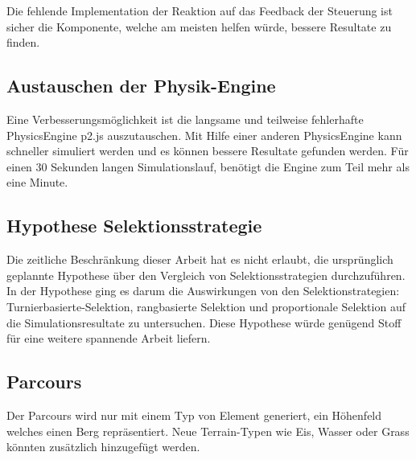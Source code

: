       Die fehlende Implementation der Reaktion auf das Feedback der Steuerung ist sicher die Komponente,
      welche am meisten helfen würde, bessere Resultate zu finden.

    \subsection{Austauschen der Physik-Engine}

      Eine Verbesserungsmöglichkeit ist die langsame und teilweise fehlerhafte \gls{PhysicsEngine} p2.js auszutauschen.
      Mit Hilfe einer anderen \gls{PhysicsEngine} kann schneller simuliert werden und es können bessere Resultate gefunden werden.
      Für einen 30 Sekunden langen Simulationslauf, benötigt die Engine zum Teil mehr als eine Minute.

    \subsection{Hypothese Selektionsstrategie}

      Die zeitliche Beschränkung dieser Arbeit hat es nicht erlaubt,
      die ursprünglich geplannte Hypothese über den Vergleich von Selektionsstrategien durchzuführen.
      In der Hypothese ging es darum die Auswirkungen von den Selektionstrategien:
      Turnierbasierte-Selektion, rangbasierte Selektion
      und proportionale Selektion auf die Simulationsresultate zu untersuchen.
      Diese Hypothese würde genügend Stoff für eine weitere spannende Arbeit liefern.

    \subsection{Parcours}

      Der Parcours wird nur mit einem Typ von Element generiert, ein Höhenfeld welches einen Berg repräsentiert.
      Neue Terrain-Typen wie Eis, Wasser oder Grass könnten zusätzlich hinzugefügt werden.






